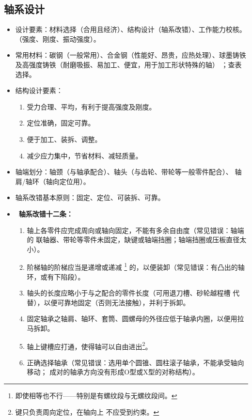 \documentclass[12pt,a4paper]{article}
\newcommand{\tightlist}{\setlength{\parskip}{0pt}\setlength{\itemsep}{0pt}}
\newcommand{\hint}[1]{\textsf{（#1）}}
\newcommand{\minor}[1]{{\color{gray} #1}}
\renewcommand{\emph}[1]{\faIcon[regular]{lightbulb}\ \textbf{#1}}
\begin{document}
\subsection{轴系设计}
\begin{itemize}\tightlist
    \item 设计要素：材料选择\hint{合用且经济}、结构设计\hint{轴系改错}、工作能力校核。
    \hint{强度、刚度、振动强度}。
    \item 常用材料：碳钢\hint{一般常用}、合金钢\hint{性能好、昂贵，应热处理}、球墨铸铁
    及高强度铸铁\hint{耐磨吸振、易加工、便宜，用于加工形状特殊的轴}\minor{；查表选择}。
    \item 结构设计要素：
    \begin{enumerate}\tightlist
        \item 受力合理、平均，有利于提高强度及刚度。
        \item 定位准确，固定可靠。
        \item 便于加工、装拆、调整。
        \item 减少应力集中，节省材料、减轻质量。
    \end{enumerate}
    \item 轴端划分：轴颈\hint{与轴承配合}、轴头\hint{与齿轮、带轮等一般零件配合}、
    轴肩/轴环\hint{轴向定位用}。
    \item 轴系改错基本原则：固定、定位、可装拆、可靠。
    \item \emph{轴系改错十二条：}
    \begin{enumerate}\tightlist
        \item 轴上各零件应完成周向或轴向固定，不能有多余自由度\hint{常见错误：轴端的
        联轴器、带轮等零件未固定，缺键或轴端挡圈；轴端挡圈或压板直径太小}。
        \item 阶梯轴的阶梯应当是递增或递减
        \footnote{即使相等也不行——特别是有螺纹段与无螺纹段间。}
        的，以便装卸\hint{常见错误：有凸出的轴环，或有下陷段}。
        \item 轴头的长度应略小于与之配合的零件长度\hint{可用退刀槽、砂轮越程槽
        代替}，以便可靠地固定\hint{否则无法接触}，并利于拆卸。
        \item 固定轴承之轴肩、轴环、套筒、圆螺母的外径应低于轴承内圈，以便用拉马拆卸。
        \item 轴上键槽应打通，使得轴可以自由进出\footnote{键只负责周向定位，在轴向上
        不应受到约束。}。
        \item 正确选择轴承\hint{常见错误：选用单个圆锥、圆柱滚子轴承，不能承受轴向移动；
        成对的轴承方向没有形成O型或X型的对称结构}。

\end{enumerate}
\end{itemize}
\end{document}
